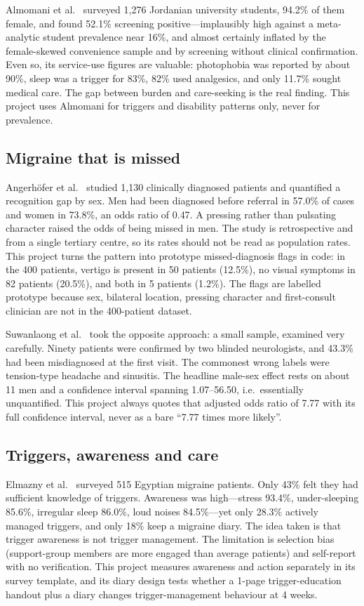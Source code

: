 \documentclass[conference]{IEEEtran}
\begin{document}
Almomani et al.~\cite{almomani2025} surveyed 1,276 Jordanian university students, 94.2\% of them female, and found 52.1\% screening positive---implausibly high against a meta-analytic student prevalence near 16\%, and almost certainly inflated by the female-skewed convenience sample and by screening without clinical confirmation. Even so, its service-use figures are valuable: photophobia was reported by about 90\%, sleep was a trigger for 83\%, 82\% used analgesics, and only 11.7\% sought medical care. The gap between burden and care-seeking is the real finding. This project uses Almomani for triggers and disability patterns only, never for prevalence.

\subsection{Migraine that is missed}
Angerh\"ofer et al.~\cite{angerhofer2025} studied 1,130 clinically diagnosed patients and quantified a recognition gap by sex. Men had been diagnosed before referral in 57.0\% of cases and women in 73.8\%, an odds ratio of 0.47. A pressing rather than pulsating character raised the odds of being missed in men. The study is retrospective and from a single tertiary centre, so its rates should not be read as population rates. This project turns the pattern into prototype missed-diagnosis flags in code: in the 400 patients, vertigo is present in 50 patients (12.5\%), no visual symptoms in 82 patients (20.5\%), and both in 5 patients (1.2\%). The flags are labelled prototype because sex, bilateral location, pressing character and first-consult clinician are not in the 400-patient dataset.

Suwanlaong et al.~\cite{suwanlaong2025} took the opposite approach: a small sample, examined very carefully. Ninety patients were confirmed by two blinded neurologists, and 43.3\% had been misdiagnosed at the first visit. The commonest wrong labels were tension-type headache and sinusitis. The headline male-sex effect rests on about 11 men and a confidence interval spanning 1.07--56.50, i.e.\ essentially unquantified. This project always quotes that adjusted odds ratio of 7.77 with its full confidence interval, never as a bare ``7.77 times more likely''.

\subsection{Triggers, awareness and care}
Elmazny et al.~\cite{elmazny2025} surveyed 515 Egyptian migraine patients. Only 43\% felt they had sufficient knowledge of triggers. Awareness was high---stress 93.4\%, under-sleeping 85.6\%, irregular sleep 86.0\%, loud noises 84.5\%---yet only 28.3\% actively managed triggers, and only 18\% keep a migraine diary. The idea taken is that trigger awareness is not trigger management. The limitation is selection bias (support-group members are more engaged than average patients) and self-report with no verification. This project measures awareness and action separately in its survey template, and its diary design tests whether a 1-page trigger-education handout plus a diary changes trigger-management behaviour at 4 weeks.
\end{document}
